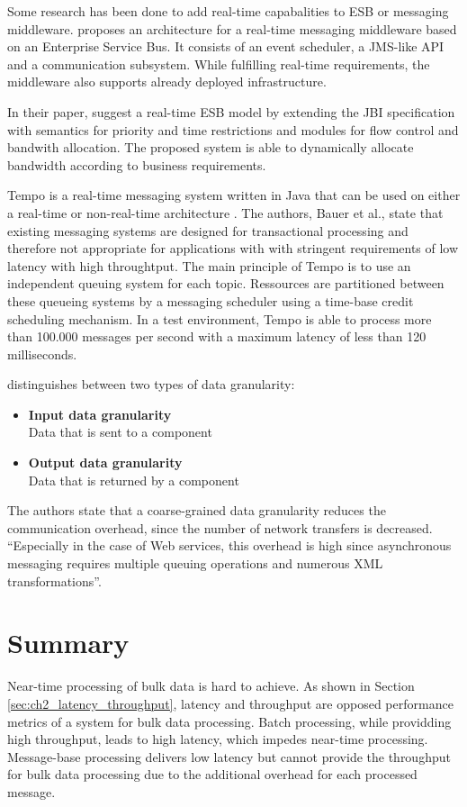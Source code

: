Some research has been done to add real-time capabalities to ESB or messaging middleware. \cite{Garces-Erice:2009kx} proposes an architecture for a real-time messaging middleware based on an Enterprise Service Bus. It consists of an event scheduler, a \ac{JMS}-like API and a communication subsystem. While fulfilling real-time requirements, the middleware also supports already deployed infrastructure.

In their paper, \cite{Xia:2011rt} suggest a real-time ESB model by extending the JBI specification with semantics for priority and time restrictions and modules for flow control and bandwith allocation. The proposed system is able to dynamically allocate bandwidth according to business requirements.

Tempo is a real-time messaging system written in Java that can be used on either a real-time or non-real-time architecture \citep{Bauer:2008fk}. The authors, Bauer et al., state that existing messaging systems are designed for transactional processing and therefore not appropriate for applications with with stringent requirements of low latency with high throughtput. The main principle of Tempo is to use an independent queuing system for each topic. Ressources are partitioned between these queueing systems by a messaging scheduler using a time-base credit scheduling mechanism. In a test environment, Tempo is able to process more than 100.000 messages per second with a maximum latency of less than 120 milliseconds.

\cite{Haesen:2008ve} distinguishes between two types of data granularity:
\begin{itemize}
	\item \textbf{Input data granularity}\\
	Data that is sent to a component
	\item \textbf{Output data granularity}\\
	Data that is returned by a component
\end{itemize}
The authors state that a coarse-grained data granularity reduces the communication overhead, since the number of network transfers is decreased.
``Especially in the case of Web services, this overhead is high since asynchronous messaging requires multiple queuing operations and numerous XML transformations''.


\section{Summary}\label{sec:ch4_summary}
Near-time processing of bulk data is hard to achieve. As shown in Section \ref{sec:ch2_latency_throughput}, latency and throughput are opposed performance metrics of a system for bulk data processing. Batch processing, while providding high throughput, leads to high latency, which impedes near-time processing. Message-base processing delivers low latency but cannot provide the throughput for bulk data processing due to the additional overhead for each processed message.

